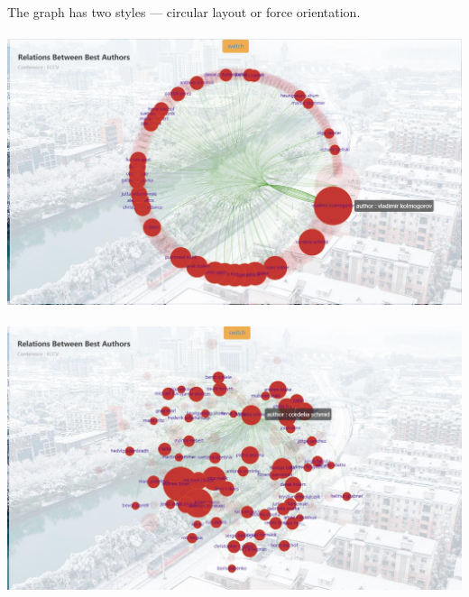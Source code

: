 \documentclass{article}
\begin{document}
	The graph has two styles --- circular layout or force orientation.\\\\
	\includegraphics[width=\textwidth]{circular.jpg}\\\\
	\includegraphics[width=\textwidth]{force.jpg}\\
	\restoregeometry
\end{document}
